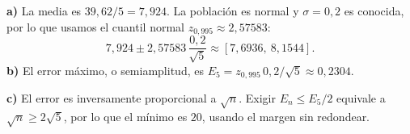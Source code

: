 \textbf{a)} La media es $39{,}62/5=7{,}924$. La población es normal y $\sigma=0{,}2$ es conocida, por lo que usamos el cuantil normal $z_{0{,}995}\approx2{,}57583$:
\[
7{,}924\pm 2{,}57583\,\frac{0{,}2}{\sqrt5}
\approx\boxed{[7{,}6936,\ 8{,}1544]}.
\]
\textbf{b)} El error máximo, o semiamplitud, es $E_5=z_{0{,}995}\,0{,}2/\sqrt5\approx\boxed{0{,}2304}$.

\textbf{c)} El error es inversamente proporcional a $\sqrt n$. Exigir $E_n\le E_5/2$ equivale a $\sqrt n\ge2\sqrt5$, por lo que el mínimo es $\boxed{20}$, usando el margen sin redondear.
